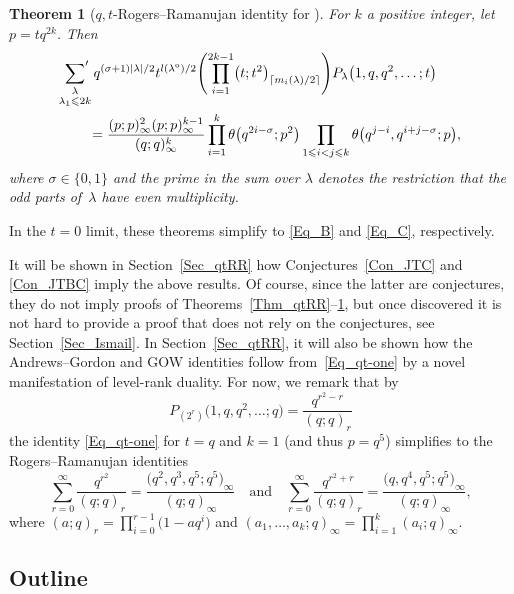 \documentclass[pdftex]{sigma}
\numberwithin{equation}{section}
\newtheorem{Theorem}{Theorem}[section]
\renewcommand{\leq}{\leqslant}
\newcommand{\ceil}[1]{\lceil#1\rceil}
\newcommand{\abs}[1]{\vert#1\vert}
\newcommand{\la}{\lambda}
\begin{document}
\begin{Theorem}[$q,t$-Rogers--Ramanujan identity for
]\label{Thm_qtRR4}
For $k$ a positive integer, let $p=tq^{2k}$.
Then
\begin{align*}
&\sideset{}{'}\sum_{\substack{\la \\[1pt] \la_1\leq 2k}}
q^{(\sigma+1)\abs{\la}/2}t^{l(\la^{\textup{o}})/2}
\Biggl( \prod_{i=1}^{2k-1}\bigl(t;t^2\bigr)_{\ceil{m_i(\la)/2}}\Biggr)
P_{\la}\bigl(1,q,q^2,\dots;t\bigr) \\
&\qquad =\frac{(p;p)_{\infty}^2(p;p)_{\infty}^{k-1}}
{(q;q)_{\infty}^k}
\prod_{i=1}^k \theta\bigl(q^{2i-\sigma};p^2\bigr)
\prod_{1\leq i<j\leq k}\theta\bigl(q^{j-i},q^{i+j-\sigma};p\bigr),
\end{align*}
where $\sigma\in\{0,1\}$ and the prime in the sum over $\la$ denotes
the restriction that the odd parts of~$\la$ have even multiplicity.
\end{Theorem}

In the $t=0$ limit, these theorems simplify to \eqref{Eq_B} and \eqref{Eq_C},
respectively.

It will be shown in Section~\ref{Sec_qtRR} how
Conjectures~\ref{Con_JTC} and \ref{Con_JTBC} imply the above results.
Of course, since the latter are conjectures, they do not imply
proofs of Theorems~\ref{Thm_qtRR}--\ref{Thm_qtRR4}, but once discovered
it is not hard to provide a proof that does not rely on the conjectures,
see Section~\ref{Sec_Ismail}.
In Section~\ref{Sec_qtRR}, it will also be shown how the Andrews--Gordon
and GOW identities follow from~\eqref{Eq_qt-one} by a novel manifestation
of level-rank duality.
For now, we remark that by
\[
P_{(2^r)}\bigl(1,q,q^2,\dots;q\bigr)=\frac{q^{r^2-r}}{(q;q)_r}
\]
the identity \eqref{Eq_qt-one} for $t=q$ and $k=1$ \big(and thus $p=q^5$\big)
simplifies to the Rogers--Ramanujan identities
\cite{Rogers94,Rogers17,RR19}
\[
\sum_{r=0}^{\infty}\frac{q^{r^2}}{(q;q)_r}
=\frac{\bigl(q^2,q^3,q^5;q^5\bigr)_{\infty}}{(q;q)_{\infty}}
\quad\text{and}\quad
\sum_{r=0}^{\infty}\frac{q^{r^2+r}}{(q;q)_r}
=\frac{\bigl(q,q^4,q^5;q^5\bigr)_{\infty}}{(q;q)_{\infty}},
\]
where $(a;q)_r=\prod_{i=0}^{r-1}\bigl(1-aq^i\bigr)$ and
$(a_1,\dots,a_k;q)_{\infty}=\prod_{i=1}^k (a_i;q)_{\infty}$.


\subsection{Outline}
\end{document}
